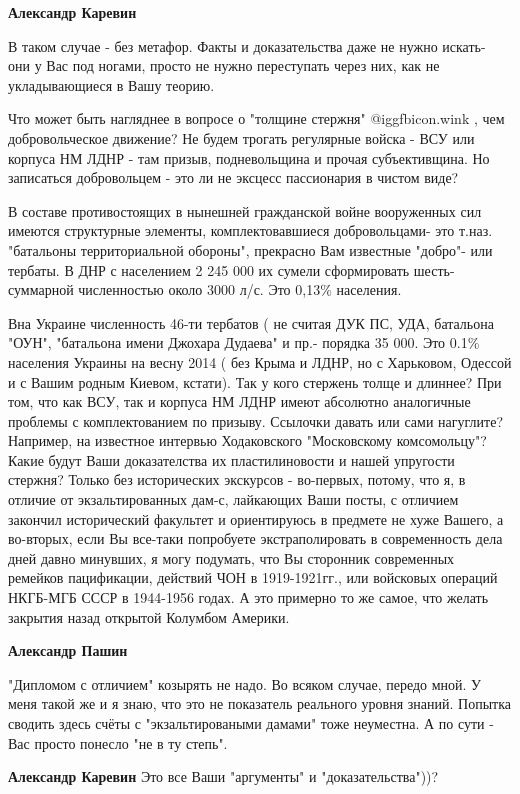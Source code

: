 \begin{itemize}
\begin{itemize}
\textbf{Александр Каревин} 

В таком случае - без метафор. Факты и доказательства даже не нужно искать- они у
Вас под ногами, просто не нужно переступать через них, как не укладывающиеся в
Вашу теорию. 

Что может быть нагляднее в вопросе о "толщине стержня" @igg{fbicon.wink} , чем
добровольческое движение? Не будем трогать регулярные войска - ВСУ или корпуса
НМ ЛДНР - там призыв, подневольщина и прочая субъективщина. Но записаться
добровольцем - это ли не эксцесс пассионария в чистом виде? 

В составе противостоящих в нынешней гражданской войне вооруженных сил имеются
структурные элементы, комплектовавшиеся добровольцами- это т.наз. "батальоны
территориальной обороны", прекрасно Вам известные "добро"- или тербаты. В ДНР с
населением 2 245 000 их сумели сформировать шесть-суммарной численностью около
3000 л/с. Это 0,13\% населения. 

Вна Украине численность 46-ти тербатов ( не считая ДУК ПС, УДА, батальона
"ОУН", "батальона имени Джохара Дудаева" и пр.- порядка 35 000. Это 0.1\%
населения Украины на весну 2014 ( без Крыма и ЛДНР, но с Харьковом, Одессой и с
Вашим родным Киевом, кстати). Так у кого стержень толще и длиннее? При том, что
как ВСУ, так и корпуса НМ ЛДНР имеют абсолютно аналогичные проблемы с
комплектованием по призыву. Ссылочки давать или сами нагуглите? Например, на
известное интервью Ходаковского "Московскому комсомольцу"? Какие будут Ваши
доказателства их пластилиновости и нашей упругости стержня? Только без
исторических экскурсов - во-первых, потому, что я, в отличие от экзальтированных
дам-с, лайкающих Ваши посты, с отличием закончил исторический факультет и
ориентируюсь в предмете не хуже Вашего, а во-вторых, если Вы все-таки
попробуете экстраполировать в современность дела дней давно минувших, я могу
подумать, что Вы сторонник современных ремейков пацификации, действий ЧОН в
1919-1921гг., или войсковых операций НКГБ-МГБ СССР в 1944-1956 годах. А это
примерно то же самое, что желать закрытия назад открытой Колумбом Америки.

\textbf{Александр Пашин} 

"Дипломом с отличием" козырять не надо. Во всяком случае, передо мной. У меня
такой же и я знаю, что это не показатель реального уровня знаний. Попытка
сводить здесь счёты с "экзальтироваными дамами" тоже неуместна. А по сути - Вас
просто понесло "не в ту степь".

\textbf{Александр Каревин} Это все Ваши "аргументы" и "доказательства"))?


\end{itemize}
\end{itemize}
